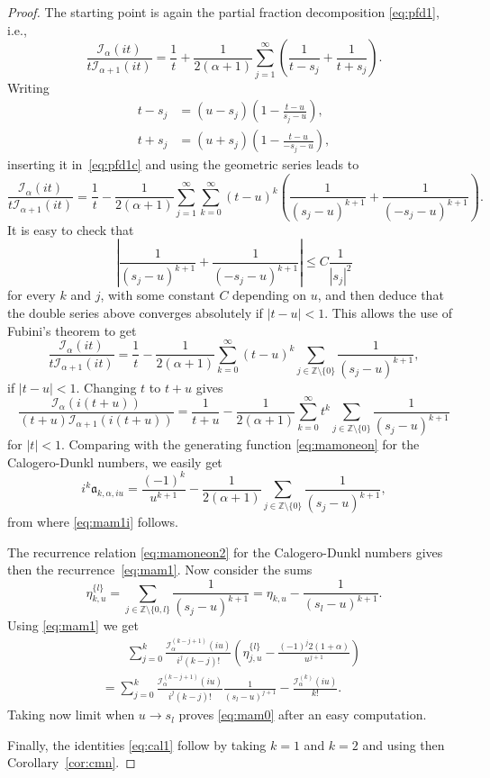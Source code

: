 \documentclass[10pt,a4paper]{article}
\theoremstyle{plain}
\theoremstyle{definition}
\numberwithin{equation}{section} %
\newcommand{\I}{\mathcal{I}}
\newcommand{\am}{\mathfrak{a}}
\newcommand{\ZZ}{\mathbb{Z}}
\newcommand{\ZZO}{\mathbb{Z} \setminus \{0\}}
\begin{document}
\begin{proof}
The starting point is again the partial fraction decomposition \eqref{eq:pfd1}, i.e.,
\begin{equation}
\label{eq:pfd1c}
  \frac{\I_\alpha (it)}{t\I_{\alpha+1}(it)}
  = \frac{1}{t} + \frac{1}{2(\alpha+1)} \sum_{j=1}^\infty \left(\frac{1}{t-s_j}+\frac{1}{t+s_j}\right).
\end{equation}
Writing
\begin{align*}
  t-s_j &= (u-s_j)\left(1-\frac{t-u}{s_j-u}\right),
  \\
  t+s_j &= (u+s_j)\left(1-\frac{t-u}{-s_j-u}\right),
\end{align*}
inserting it in~\eqref{eq:pfd1c} and using the geometric series leads to
\[
  \frac{\I_\alpha(it)}{t\I_{\alpha+1}(it)}
  = \frac{1}{t} - \frac{1}{2(\alpha+1)} \sum_{j=1}^\infty
  \sum_{k=0}^\infty (t-u)^k \left( \frac{1}{(s_j-u)^{k+1}} + \frac{1}{(-s_j-u)^{k+1}} \right).
\]
It is easy to check that
\[
   \left| \frac{1}{(s_j-u)^{k+1}} + \frac{1}{(-s_j-u)^{k+1}} \right|
   \leq C \frac{1}{|s_j|^2}
\]
for every $k$ and $j$, with some constant $C$ depending on $u$, and then deduce that the double series above converges absolutely if $|t-u| < 1$. This allows the use of Fubini's theorem to get
\[
  \frac{\I_\alpha(it)}{t\I_{\alpha+1}(it)}
  = \frac{1}{t} - \frac{1}{2(\alpha+1)}
  \sum_{k=0}^\infty (t-u)^k \sum_{j\in \ZZO} \frac{1}{(s_j-u)^{k+1}},
\]
if $|t-u| < 1$. Changing $t$ to $t+u$ gives
\[
  \frac{\I_\alpha(i(t+u))}{(t+u)\I_{\alpha+1}(i(t+u))}
  = \frac{1}{t+u} - \frac{1}{2(\alpha+1)}
  \sum_{k=0}^\infty t^k \sum_{j\in \ZZO} \frac{1}{(s_j-u)^{k+1}}
\]
for $|t| < 1$. Comparing with the generating function \eqref{eq:mamoneon} for the Calogero-Dunkl numbers,
we easily get
\[
  i^k \am_{k,\alpha,iu} = \frac{(-1)^k}{u^{k+1}} - \frac{1}{2(\alpha+1)}
  \sum_{j\in \ZZO} \frac{1}{(s_j-u)^{k+1}},
\]
from where \eqref{eq:mam1i} follows.

The recurrence relation \eqref{eq:mamoneon2} for the Calogero-Dunkl numbers gives then the recurrence~\eqref{eq:mam1}. Now consider the sums
\[
  \eta_{k,u}^{\{l\}} = \sum_{j\in \ZZ\setminus\{0,l\}} \frac{1}{(s_j-u)^{k+1}}
  = \eta_{k,u}-\frac{1}{(s_l-u)^{k+1}}.
\]
Using \eqref{eq:mam1} we get
\begin{multline*}
\qquad
  \sum_{j=0}^k \frac{\I_\alpha^{(k-j+1)}(iu)}{i^j(k-j)!}
  \left(\eta_{j,u}^{\{l\}}-\frac{(-1)^j 2(1+\alpha)}{u^{j+1}}\right)
  \\
  = \sum_{j=0}^k \frac{\I_\alpha^{(k-j+1)}(iu)}{i^j(k-j)!}
  \frac{1}{(s_l-u)^{j+1}}-\frac{\I_\alpha^{(k)}(iu)}{k!}.
\qquad
\end{multline*}
Taking now limit when $u\to s_l$ proves \eqref{eq:mam0} after an easy computation.

Finally, the identities \eqref{eq:cal1} follow by taking $k=1$ and $k=2$ and using then Corollary~\ref{cor:cmn}.
\end{proof}
\end{document}
